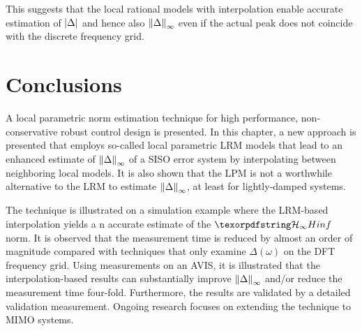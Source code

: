 This suggests that the local rational models with interpolation enable accurate estimation of  $\left| \Delta \right|$ and hence also $\left\| \Delta \right\|_{\infty}$ even if the actual peak does not coincide with the discrete frequency grid.

\section{Conclusions}
\label{sec:lrmhinf:conclusion}
A local parametric \Hinf{} norm estimation technique for high performance, non-conservative robust control design is presented.
In this chapter, a new approach is presented that employs so-called local parametric \gls{LRM} models that lead to an enhanced estimate of $\left\| \Delta \right\|_{\infty}$ of a \gls{SISO} error system by interpolating between neighboring local models.
It is also shown that the \gls{LPM} is not a worthwhile alternative to the \gls{LRM} to estimate $\left\| \Delta \right\|_{\infty}$, at least for lightly-damped systems.

The technique is illustrated on a simulation example where the \gls{LRM}-based interpolation yields a n accurate estimate of the $\Hinf{}$ norm.
It is observed that the measurement time is reduced by almost an order of magnitude compared with techniques that only examine $\Delta(\omega)$ on the \gls{DFT} frequency grid.
Using measurements on an \gls{AVIS}, it is illustrated that the interpolation-based results can substantially improve $\left\| \Delta \right\|_{\infty}$ and/or reduce the measurement time four-fold.
Furthermore, the results are validated by a detailed validation measurement.
Ongoing research focuses on extending the technique to \gls{MIMO} systems.

\begin{subappendices}
  
\end{subappendices}
